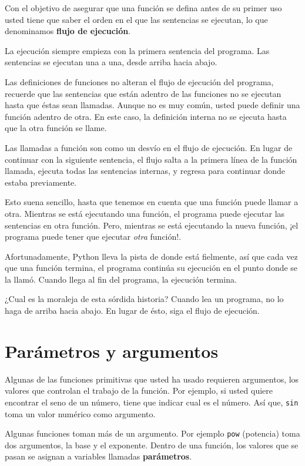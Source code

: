 Con el objetivo de asegurar que una función se defina antes de su 
primer uso usted tiene que saber el orden en el que las sentencias
se ejecutan, lo que denominamos {\bf flujo de ejecución}.

La ejecución siempre empieza con la primera sentencia del programa. Las sentencias
se ejecutan una a una, desde arriba hacia abajo.

Las definiciones de funciones no alteran el flujo de ejecución del programa, recuerde
que las sentencias que están adentro de las funciones no se ejecutan hasta que éstas
sean llamadas. Aunque no es muy común, usted puede definir una función adentro de otra.
En este caso, la definición interna no se ejecuta hasta que la otra función se llame.

Las llamadas a función son como un desvío en el flujo de ejecución. En lugar de
continuar con la siguiente sentencia, el flujo salta a la primera línea de la función
llamada, ejecuta todas las sentencias internas, y regresa para continuar donde estaba
previamente.

Esto suena sencillo, hasta que tenemos en cuenta que una función puede llamar a otra.
Mientras  se está ejecutando una función, el programa puede ejecutar las sentencias
en otra función. Pero, mientras se está ejecutando la nueva función, ¡el programa
puede tener que ejecutar \textit{otra} función!.

Afortunadamente, Python lleva la pista de donde está fielmente, así que cada vez
que una función termina, el programa continúa su ejecución en el punto donde se 
la llamó. Cuando llega al fin del programa, la ejecución termina.

¿Cual es la moraleja de esta sórdida historia? Cuando lea un programa, no lo haga
de arriba hacia abajo. En lugar de ésto, siga el flujo de ejecución.


\section{Parámetros y argumentos}
\label{parameters}

Algunas de las funciones primitivas que usted ha usado requieren argumentos,
los valores que controlan el trabajo de la función. Por ejemplo, si usted
quiere encontrar el seno de un número, tiene que indicar cual es el número.
Así que, \texttt{sin} toma un valor numérico como argumento.

Algunas funciones toman más de un argumento. Por ejemplo  \texttt{pow} (potencia)
toma dos argumentos, la base y el exponente.  Dentro de una función,
los valores que se pasan se asignan a variables llamadas  {\bf parámetros}.

